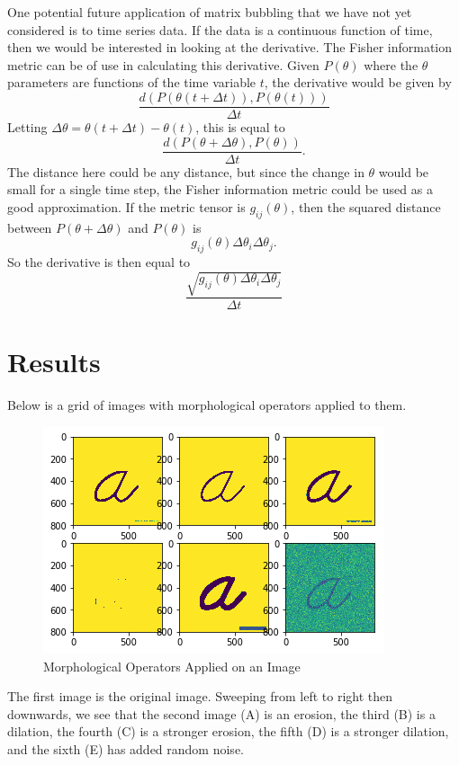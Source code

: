 \documentclass{article}
\begin{document}
One potential future application of matrix bubbling that we have not yet
considered is to time series data. If the data is a continuous function of
time, then we would be interested in looking at the derivative. The Fisher
information metric can be of use in calculating this derivative. Given
$P(\theta)$ where the $\theta$ parameters are functions of the time variable
$t$, the derivative would be given by
\[
    \frac{d(P(\theta(t+\Delta t)),P(\theta(t)))}{\Delta t}
\]
Letting $\Delta\theta=\theta(t+\Delta t)-\theta(t)$, this is equal to
\[
    \frac{d(P(\theta+\Delta\theta),P(\theta))}{\Delta t}.
\]
The distance here could be any distance, but since the change in $\theta$ would
be small for a single time step, the Fisher information metric could be used as
a good approximation. If the metric tensor is $g_{ij}(\theta)$, then the
squared distance between $P(\theta+\Delta\theta)$ and $P(\theta)$ is
\[
    g_{ij}(\theta)\Delta\theta_i\Delta\theta_j.
\]
So the derivative is then equal to
\[
    \frac{\sqrt{g_{ij}(\theta)\Delta\theta_i\Delta\theta_j}}{\Delta t}
\]

\section{Results}

Below is a grid of images with morphological operators applied to them.

\begin{figure}[h!]
\begin{center}
\includegraphics[scale=0.7]{a-grid.png}
\caption{Morphological Operators Applied on an Image}
\end{center}
\end{figure}

The first image is the original image. Sweeping from left to right then
downwards, we see that the second image (A) is an erosion, the third (B) is a
dilation, the fourth (C) is a stronger erosion, the fifth (D) is a stronger
dilation, and the sixth (E) has added random noise.\\
\end{document}
